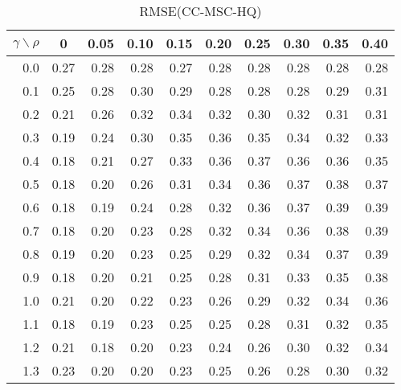 \documentclass[12pt]{article}
\begin{document}
%
\begin{table}[!tbp]
\caption{RMSE(CC-MSC-HQ)}
 \begin{center}
 \begin{tabular}{r|rrrrrrrrr}\hline\hline
\multicolumn{1}{c|}{$\gamma\backslash\rho$}&\multicolumn{1}{c}{0}&\multicolumn{1}{c}{0.05}&\multicolumn{1}{c}{0.10}&\multicolumn{1}{c}{0.15}&\multicolumn{1}{c}{0.20}&\multicolumn{1}{c}{0.25}&\multicolumn{1}{c}{0.30}&\multicolumn{1}{c}{0.35}&\multicolumn{1}{c}{0.40}\tabularnewline
\hline
0.0&0.27&0.28&0.28&0.27&0.28&0.28&0.28&0.28&0.28\tabularnewline
0.1&0.25&0.28&0.30&0.29&0.28&0.28&0.28&0.29&0.31\tabularnewline
0.2&0.21&0.26&0.32&0.34&0.32&0.30&0.32&0.31&0.31\tabularnewline
0.3&0.19&0.24&0.30&0.35&0.36&0.35&0.34&0.32&0.33\tabularnewline
0.4&0.18&0.21&0.27&0.33&0.36&0.37&0.36&0.36&0.35\tabularnewline
0.5&0.18&0.20&0.26&0.31&0.34&0.36&0.37&0.38&0.37\tabularnewline
0.6&0.18&0.19&0.24&0.28&0.32&0.36&0.37&0.39&0.39\tabularnewline
0.7&0.18&0.20&0.23&0.28&0.32&0.34&0.36&0.38&0.39\tabularnewline
0.8&0.19&0.20&0.23&0.25&0.29&0.32&0.34&0.37&0.39\tabularnewline
0.9&0.18&0.20&0.21&0.25&0.28&0.31&0.33&0.35&0.38\tabularnewline
1.0&0.21&0.20&0.22&0.23&0.26&0.29&0.32&0.34&0.36\tabularnewline
1.1&0.18&0.19&0.23&0.25&0.25&0.28&0.31&0.32&0.35\tabularnewline
1.2&0.21&0.18&0.20&0.23&0.24&0.26&0.30&0.32&0.34\tabularnewline
1.3&0.23&0.20&0.20&0.23&0.25&0.26&0.28&0.30&0.32\tabularnewline
\hline
\end{tabular}

\end{center}

\end{table}
\end{document}
